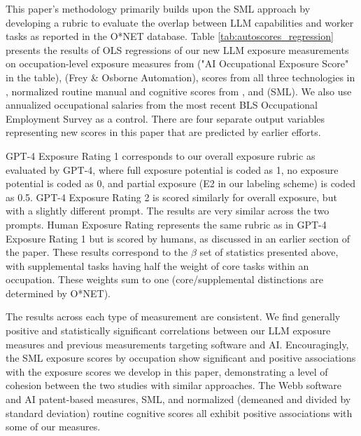 \documentclass[11pt]{article}
\begin{document}
This paper's methodology primarily builds upon the SML approach by developing a rubric to evaluate the overlap between LLM capabilities and worker tasks as reported in the O*NET database. Table \ref{tab:autoscores_regression} presents the results of OLS regressions of our new LLM exposure measurements on occupation-level exposure measures from \citep{SeamansRajFelten2018} ("AI Occupational Exposure Score" in the table), \citep{FreyOsborne2017} (Frey \& Osborne Automation), scores from all three technologies in \citep{Webb2020}, normalized routine manual and cognitive scores from \citep{acemoglu2011skills}, and \citep{Brynjolfsson2018,brynjolfssonQuantifyingDistributionMachine2023} (SML). We also use annualized occupational salaries from the most recent BLS Occupational Employment Survey as a control. There are four separate output variables representing new scores in this paper that are predicted by earlier efforts.

GPT-4 Exposure Rating 1 corresponds to our overall exposure rubric as evaluated by GPT-4, where full exposure potential is coded as 1, no exposure potential is coded as 0, and partial exposure (E2 in our labeling scheme) is coded as 0.5. GPT-4 Exposure Rating 2 is scored similarly for overall exposure, but with a slightly different prompt. The results are very similar across the two prompts. Human Exposure Rating represents the same rubric as in GPT-4 Exposure Rating 1 but is scored by humans, as discussed in an earlier section of the paper. These results correspond to the $\beta$ set of statistics presented above, with supplemental tasks having half the weight of core tasks within an occupation. These weights sum to one (core/supplemental distinctions are determined by O*NET).

The results across each type of measurement are consistent. We find generally positive and statistically significant correlations between our LLM exposure measures and previous measurements targeting software and AI. Encouragingly, the SML exposure scores by occupation show significant and positive associations with the exposure scores we develop in this paper, demonstrating a level of cohesion between the two studies with similar approaches. The Webb software and AI patent-based measures, SML, and normalized (demeaned and divided by standard deviation) routine cognitive scores all exhibit positive associations with some of our measures.
\end{document}
